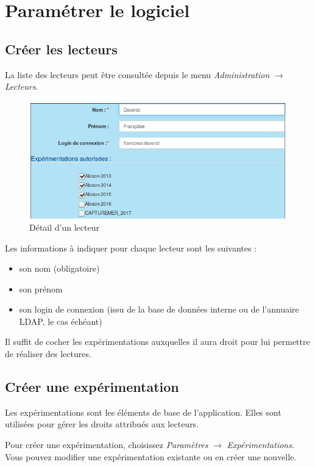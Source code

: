 \chapter{Paramétrer le logiciel}
\section{Créer les lecteurs}
La liste des lecteurs peut être consultée depuis le menu \textit{Administration}  $\rightarrow$ \textit{Lecteurs}. 

\begin{figure}[H]
\centering
\includegraphics[width=0.7\linewidth]{images/lecteurs}
\caption{Détail d'un lecteur}
\end{figure}

Les informations à indiquer pour chaque lecteur sont les suivantes :
\begin{itemize}
\item son nom (obligatoire)
\item son prénom
\item son login de connexion (issu de la base de données interne ou de l'annuaire LDAP, le cas échéant)
\end{itemize}

Il suffit de cocher les expérimentations auxquelles il aura droit pour lui permettre de réaliser des lectures.


\section{Créer une expérimentation}
Les expérimentations sont les éléments de base de l'application. Elles sont utilisées pour gérer les droits attribués aux lecteurs.

Pour créer une expérimentation, choisissez \textit{Paramètres}  $\rightarrow$ \textit{Expérimentations}. Vous pouvez modifier une expérimentation existante ou en créer une nouvelle.

